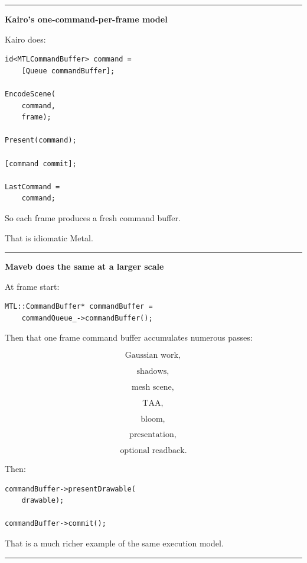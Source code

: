 \begin{center}\rule{0.5\linewidth}{0.5pt}\end{center}

\textbf{Kairo's one-command-per-frame model}

Kairo does:

\begin{verbatim}
id<MTLCommandBuffer> command =
    [Queue commandBuffer];

EncodeScene(
    command,
    frame);

Present(command);

[command commit];

LastCommand =
    command;
\end{verbatim}

So each frame produces a fresh command buffer.

That is idiomatic Metal.

\begin{center}\rule{0.5\linewidth}{0.5pt}\end{center}

\textbf{Maveb does the same at a larger scale}

At frame start:

\begin{verbatim}
MTL::CommandBuffer* commandBuffer =
    commandQueue_->commandBuffer();
\end{verbatim}

Then that one frame command buffer accumulates numerous passes:

\[
\text{Gaussian work},
\]

\[
\text{shadows},
\]

\[
\text{mesh scene},
\]

\[
\text{TAA},
\]

\[
\text{bloom},
\]

\[
\text{presentation},
\]

\[
\text{optional readback}.
\]

Then:

\begin{verbatim}
commandBuffer->presentDrawable(
    drawable);

commandBuffer->commit();
\end{verbatim}

That is a much richer example of the same execution model.

\begin{center}\rule{0.5\linewidth}{0.5pt}\end{center}

